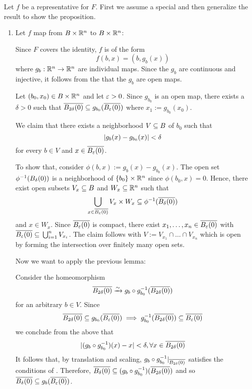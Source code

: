\begin{myproof}
    Let $f$ be a representative for $F$.
    First we assume a special and then generalize the result to show the proposition.
    \begin{enumerate}
        \item Let $f$ map from $B \times \mathbb{R}^n$ to $B \times \mathbb{R}^n$:
        
        Since $F$ covers the identity, $f$ is of the form
        \[ f(b, x) = (b, g_b(x)) \]
        where $g_b: \mathbb{R}^n \to \mathbb{R}^n$ are individual maps.
        Since the $g_b$ are continuous and injective,
        it follows from the  that the $g_b$ are open maps.
        
        Let $(b_0, x_0) \in B \times \mathbb{R}^n$ and let $\varepsilon{} > 0$.
        Since $g_{b_0}$ is an open map, there exists a $\delta > 0$ such that
        $\clball[2\delta][x_1] \sub g_{b_0}(\clball[\eps][x_0])$ where $x_1 := g_{b_0}(x_0)$.

        We claim that there exists a neighborhood $V \subseteq{} B$ of $b_0$ such that
        \[ \vert{} g_b(x) - g_{b_0}(x) \vert{} < \delta \]
        for every $b \in V$ and $x \in \clball[\eps][x_0]$.
        
        To show that, consider $\phi(b, x) := g_b(x) - g_{b_0}(x)$.
        The open set $\inv{\phi}(\ball[\delta])$ is a neighborhood of $\{b_0\} \times \mathbb{R}^n$ since $\phi(b_0, x) = 0$.
        Hence, there exist open subsets $V_x \subseteq{} B$ and $W_x \subseteq{} \mathbb{R}^n$ such that
        \[ \bigcup_{x \in \clball[\eps][x_0]} V_x \cross W_x \sub \inv{\phi}(\clball[\delta]) \]
        and $x \in W_x$.
        Since $\clball[\eps][x_0]$ is compact, there exist $x_1, \dots, x_n \in \clball[\eps][x_0]$ with $\clball[\eps][x_0] \sub \bigcup_{i = 1}^{n} V_{x_i}$.
        The claim follows with $V := V_{x_1} \cap \dots \cap V_{x_n}$
        which is open by forming the intersection over finitely many open sets.

        Now we want to apply the previous lemma:

        Consider the homeomorphism
        \[ \clball[2\delta][x_1] \isomto g_b \circ \inv{g_{b_0}}(\clball[2\delta][x_1]) \]
        for an arbitrary $b \in V$.
        Since
        \[ \clball[2\delta][x_1] \sub g_{b_0}(\clball[\eps][x_0]) \implies \inv{g_{b_0}}(\clball[2\delta][x_1]) \sub \clball[\eps][x_0] \]
        we conclude from the above that
        \[ \abs{(g_b \circ \inv{g_{b_0}})(x) - x} < \delta, \forall x \in \clball[2\delta][x_1] \]
        It follows that, by translation and scaling, $g_b \circ \inv{g_{b_0}}\restr{\clball[2\delta][x_1]}$ satisfies the conditions of .
        Therefore, $\clball[\delta][x_1] \sub (g_b \circ \inv{g_{b_0}})(\clball[2\delta][x_0])$ and so $\clball[\delta][x_1] \sub g_b(\clball[\eps][x_0])$.


\end{enumerate}
\end{myproof}
